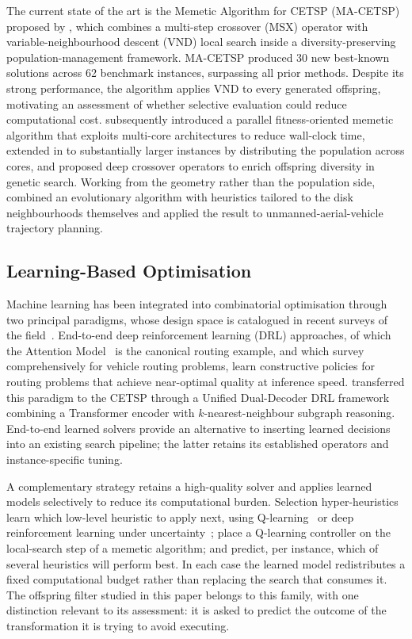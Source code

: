 \documentclass[a4paper,fleqn]{cas-dc}
\begin{document}
The current state of the art is the Memetic Algorithm for CETSP (MA-CETSP)
proposed by \citet{LEI2024111266}, which combines a multi-step crossover (MSX)
operator with variable-neighbourhood descent (VND) local search inside a
diversity-preserving population-management framework. MA-CETSP produced 30 new
best-known solutions across 62 benchmark instances, surpassing all prior
methods. Despite its strong performance, the algorithm applies VND
to every generated offspring, motivating an assessment of whether selective
evaluation could reduce computational cost.
\citet{canturk2025parallel} subsequently introduced a parallel
fitness-oriented memetic algorithm that exploits multi-core architectures to
reduce wall-clock time, extended in \citet{canturk2026scalable} to substantially
larger instances by distributing the population across cores, and
\citet{derouiche2025deep} proposed deep crossover operators to enrich offspring
diversity in genetic search. Working from the geometry rather than the
population side, \citet{cariou2023geometric} combined an evolutionary algorithm
with heuristics tailored to the disk neighbourhoods themselves and applied the
result to unmanned-aerial-vehicle trajectory planning.

\subsection{Learning-Based Optimisation}\label{sec:rel-learning}

Machine learning has been integrated into combinatorial optimisation through two
principal paradigms, whose design space is catalogued in recent surveys of the
field~\citep{talbi2021mlmeta,bolufe2025mlmeta}. End-to-end deep reinforcement
learning (DRL) approaches, of which the Attention
Model~\citep{kool2019attention} is the canonical routing example, and which
\citet{wu2026ncosurvey} survey comprehensively for vehicle routing problems,
learn constructive policies for routing problems that achieve near-optimal
quality at inference speed. \citet{fan2025ud3rl} transferred this paradigm to
the CETSP through a Unified Dual-Decoder DRL framework combining a Transformer
encoder with $k$-nearest-neighbour subgraph reasoning. End-to-end learned solvers
provide an alternative to inserting learned decisions into an existing search
pipeline; the latter retains its established operators and instance-specific
tuning.

A complementary strategy retains a high-quality solver and applies learned
models selectively to reduce its computational burden. Selection
hyper-heuristics learn which low-level heuristic to apply next, using
Q-learning~\citep{zhao2023qlhh} or deep reinforcement learning under
uncertainty~\citep{zhang2022drlhh}; \citet{zhang2024qlmemetic} place a
Q-learning controller on the local-search step of a memetic algorithm; and
\citet{karcher2025heuristic} predict, per instance, which of several heuristics
will perform best. In each case the learned model redistributes a fixed
computational budget rather than replacing the search that consumes it. The
offspring filter studied in this paper belongs to this family, with one
distinction relevant to its assessment: it is asked to predict the outcome of the
transformation it is trying to avoid executing.
\end{document}
